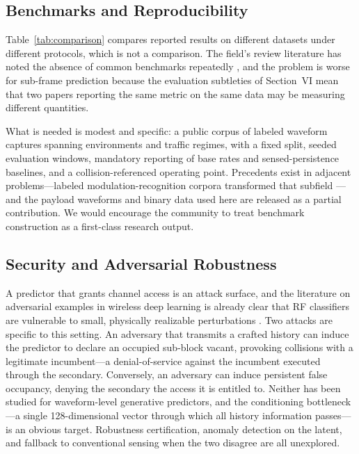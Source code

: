 \documentclass[lettersize,journal]{IEEEtran}
\begin{document}
\subsection{\textbf{Benchmarks and Reproducibility}}
Table~\ref{tab:comparison} compares reported results on different
datasets under different protocols, which is not a comparison. The
field's review literature has noted the absence of common benchmarks
repeatedly \cite{Suriya2022,Wu2017,Tidjani2019,Eltom2018}, and the
problem is worse for sub-frame prediction because the evaluation
subtleties of Section~VI mean that two papers reporting the same metric
on the same data may be measuring different quantities.

What is needed is modest and specific: a public corpus of labeled
waveform captures spanning environments and traffic regimes, with a
fixed split, seeded evaluation windows, mandatory reporting of base
rates and sensed-persistence baselines, and a collision-referenced
operating point. Precedents exist in adjacent problems---labeled
modulation-recognition corpora transformed that subfield
\cite{OShea2018}---and the payload waveforms and binary data used here
are released \cite{PayloadData} as a partial contribution. We would
encourage the community to treat benchmark construction as a
first-class research output.

\subsection{\textbf{Security and Adversarial Robustness}}
A predictor that grants channel access is an attack surface, and the
literature on adversarial examples in wireless deep learning is already
clear that RF classifiers are vulnerable to small, physically realizable
perturbations \cite{Sadeghi2019}. Two attacks are specific to this
setting. An adversary that transmits a crafted history can induce the
predictor to declare an occupied sub-block vacant, provoking collisions
with a legitimate incumbent---a denial-of-service against the incumbent
executed through the secondary. Conversely, an adversary can induce
persistent false occupancy, denying the secondary the access it is
entitled to. Neither has been studied for waveform-level generative
predictors, and the conditioning bottleneck---a single 128-dimensional
vector through which all history information passes---is an obvious
target. Robustness certification, anomaly detection on the latent, and
fallback to conventional sensing when the two disagree are all
unexplored.
\end{document}
